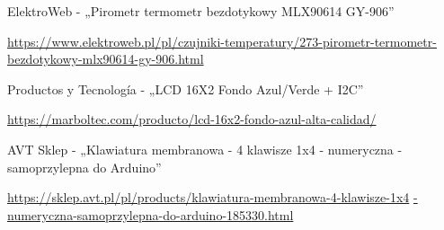 \begin{thebibliography}{999}
\begin{spacing}{1}
      ElektroWeb - „Pirometr termometr bezdotykowy MLX90614 GY-906”
    
    \url{https://www.elektroweb.pl/pl/czujniki-temperatury/273-pirometr-termometr-bezdotykowy-mlx90614-gy-906.html}

     Productos y Tecnología - „LCD 16X2 Fondo Azul/Verde + I2C”
    
    \url{https://marboltec.com/producto/lcd-16x2-fondo-azul-alta-calidad/}


     AVT Sklep - „Klawiatura membranowa - 4 klawisze 1x4 - numeryczna - samoprzylepna do Arduino”
    
    \url{https://sklep.avt.pl/pl/products/klawiatura-membranowa-4-klawisze-1x4}
    \url{-numeryczna-samoprzylepna-do-arduino-185330.html}

\end{spacing}
\end{thebibliography}